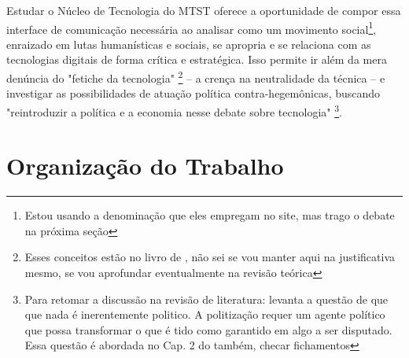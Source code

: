 Estudar o Núcleo de Tecnologia do MTST oferece a oportunidade de compor essa interface de comunicação necessária ao analisar como um movimento social\footnote{Estou usando a denominação que eles empregam no site, mas trago o debate na próxima seção}, enraizado em lutas humanísticas e sociais, se apropria e se relaciona com as tecnologias digitais de forma crítica e estratégica. Isso permite ir além da mera denúncia do "fetiche da tecnologia" \footnote{Esses conceitos estão no livro de \cite{Faustino2023}, não sei se vou manter aqui na justificativa mesmo, se vou aprofundar eventualmente na revisão teórica} – a crença na neutralidade da técnica – e investigar as possibilidades de atuação política contra-hegemônicas, buscando "reintroduzir a política e a economia nesse debate sobre tecnologia" \footnote{Para retomar a discussão na revisão de literatura: \citeauthor{fisher_2020} levanta a questão de que  que nada é inerentemente politico. A politização requer um agente político que possa transformar o que é tido como garantido em algo a ser disputado. Essa questão é abordada no Cap. 2 do \cite{Silveira2021} também, checar fichamentos}.

\section{Organização do Trabalho}
\label{sec:org}
